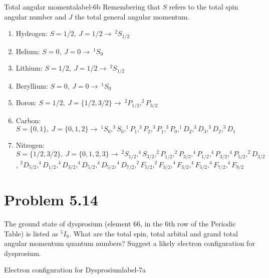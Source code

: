 \documentclass[../main.tex]{subfiles}
\begin{document}
\begin{sol}{Total angular momenta}{label-6b}
    Remembering that $S$ refers to the total spin angular number and $J$ the total general angular momentum.

    \begin{enumerate}
        \item Hydrogen: $S=1/2,~J=1/2\rightarrow~^{2}S_{1/2}$
        \item Helium: $S=0,~J=0\rightarrow~^{1}S_{0}$
        \item Lithium: $S=1/2,~J=1/2\rightarrow~^{2}S_{1/2}$
        \item Beryllium: $S=0,~J=0\rightarrow~^{1}S_{0}$
        \item Boron: $S=1/2,~J=\{1/2,3/2\}\rightarrow~^{2}P_{1/2},^{2}P_{3/2}$
        \item Carbon: $S=\{0,1\},~J=\{0,1,2\}\rightarrow~^{1}S_{0},^{3}S_{0},^{1}P_{1},^{3}P_{2},^{3}P_{1},^{3}P_{0},^{1}D_{2},^{3}D_{3},^{3}D_{2},^{3}D_{1}$ 
        \item Nitrogen: $S=\{1/2,3/2\},~J=\{0,1,2,3\}\rightarrow~^{2}S_{1/2},^{4}S_{3/2},^{2}P_{1/2},^{2}P_{3/2},^{4}P_{1/2},^{4}P_{3/2},^{4}P_{5/2},^{2}D_{3/2}$, $^{2}D_{5/2},^{4}D_{1/2},^{4}D_{3/2},^{4}D_{5/2},^{4}D_{5/2},^{4}D_{7/2},^2F_{5/2},^2F_{3/2},^4F_{3/2},^4F_{5/2},^4F_{7/2},^4F_{9/2}$ 
    \end{enumerate}

\end{sol}


\section{Problem 5.14}

The ground state of dysprosium (element 66, in the 6th row of the Periodic Table) is listed as $^5I_8$.
What are the total spin, total arbital and grand total angular momentum quantum numbers?
Suggest a likely electron configuration for dysprosium.

\begin{sol}{Electron configuration for Dysprosium}{label-7a}

\end{sol}
\end{document}

